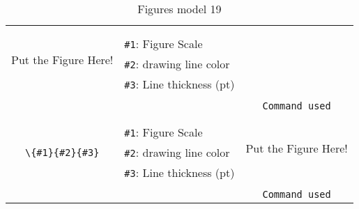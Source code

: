 \documentclass{article}
\begin{document}
\begin{table}[H]
\begin{tabular}{|c|l|c|}
\multirow{5}{*}{Put the Figure Here!}     \\
&
& 

\\
&
\verb|#1|: Figure Scale     &

\\
\verb|\{#1}{#2}{#3}|    &
\verb|#2|: drawing line color      &

\\
&
\verb|#3|: Line thickness (pt)     &

\\
&
&

\\
&
&

\verb|Command used|  \\
\hline %
& 
& 

\multirow{5}{*}{Put the Figure Here!}     \\
&
& 

\\
&
\verb|#1|: Figure Scale     &

\\
\verb|\{#1}{#2}{#3}|    &
\verb|#2|: drawing line color      &

\\
&
\verb|#3|: Line thickness (pt)     &

\\
&
&

\\
&
&

\verb|Command used|  \\
\hline
    \end{tabular}
    \caption{Figures model 19}
    \label{tab19}
\end{table}
\end{document}
